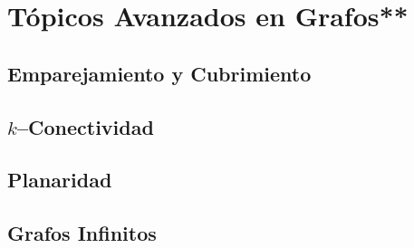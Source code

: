 \section{Tópicos Avanzados en Grafos**}

\subsection{Emparejamiento y Cubrimiento}
\subsection{$k$--Conectividad}
\subsection{Planaridad}
\subsection{Grafos Infinitos}
